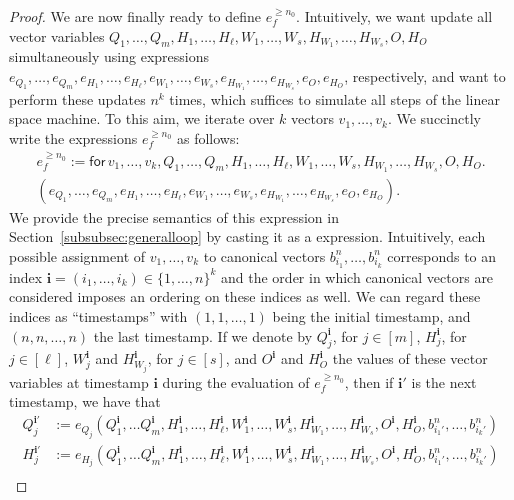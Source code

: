 \begin{proof}
    We are now finally ready to define $e_f^{\geq n_0}$. Intuitively, we want update all vector variables
	$Q_1,\ldots,\allowbreak Q_m,\allowbreak H_1,\ldots,H_\ell,W_1,\ldots,W_s, H_{W_1},\ldots,H_{W_s},O,H_O$
	simultaneously using expressions $e_{Q_1},\ldots,e_{Q_m},\allowbreak e_{H_1},\allowbreak\ldots,\allowbreak e_{H_\ell},\allowbreak e_{W_1},\ldots,e_{W_s},e_{H_{W_1}},\ldots,e_{H_{W_s}},e_{O}, e_{H_O}$, respectively, and want to perform these updates $n^k$ times,
	which suffices to simulate all steps of the linear space machine. To this aim, we iterate over $k$ vectors $v_1,\ldots, v_k$.
	We succinctly write the expressions  $e_f^{\geq n_0}$ as follows:
    \begin{multline*}
    e_f^{\geq n_0}:= \mathsf{for\,} v_1,\ldots,v_{k},Q_1,\ldots,Q_m,H_1,\ldots,H_\ell,W_1,\ldots,W_s, H_{W_1},\ldots,H_{W_s},O,H_O . \\
    (e_{Q_1},\ldots,e_{Q_m},e_{H_1},\ldots,e_{H_\ell},e_{W_1},\ldots,e_{W_s},e_{H_{W_1}},\ldots,e_{H_{W_s}},e_{O}, e_{H_O}).
    \end{multline*}
	We provide the precise semantics of this expression in Section~\ref{subsubsec:generalloop} by casting it as a \langfor expression.
	Intuitively, each possible assignment of $v_1,\ldots,v_k$ to canonical vectors $b_{i_1}^n,\ldots, b_{i_k}^n$ corresponds to an index $\mathbf{i}=(i_1,\ldots,i_k)\in\{1,\ldots,n\}^k$
	and the order in which canonical vectors are considered imposes an ordering on these indices as well. We can regard these indices as ``timestamps''
	with $(1,1,\ldots,1)$ being the initial timestamp, and $(n,n,\ldots,n)$ the last timestamp.
		If we denote by $Q_j^{\mathbf{i}}$, for $j\in[m]$, $H_j^{\mathbf{i}}$, for $j\in[\ell]$, $W_j^{\mathbf{i}}$ and $H_{W_j}^{\mathbf{i}}$, for $j\in[s]$, and 
	$O^{\mathbf{i}}$ and $H_O^{\mathbf{i}}$ the values of these vector variables at timestamp $\mathbf{i}$ during the evaluation of $e_f^{\geq n_0}$, then if $\mathbf{i}'$ is the next timestamp, we have that    
	\begin{align*}
		Q_j^{\mathbf{i}'}&:=e_{Q_j}(Q_1^{\mathbf{i}},\ldots Q_m^{\mathbf{i}},H_1^{\mathbf{i}},\ldots,H_\ell^{\mathbf{i}},W_1^{\mathbf{i}},\ldots,W_s^{\mathbf{i}},H_{W_1}^{\mathbf{i}},\ldots,H_{W_s}^{\mathbf{i}},O^{\mathbf{i}},H_O^{\mathbf{i}},b_{i_1'}^n,\ldots,b_{i_k'}^n)\\
		H_j^{\mathbf{i}'}&:=e_{H_j}(Q_1^{\mathbf{i}},\ldots Q_m^{\mathbf{i}},H_1^{\mathbf{i}},\ldots,H_\ell^{\mathbf{i}},W_1^{\mathbf{i}},\ldots,W_s^{\mathbf{i}},H_{W_1}^{\mathbf{i}},\ldots,H_{W_s}^{\mathbf{i}},O^{\mathbf{i}},H_O^{\mathbf{i}},b_{i_1'}^n,\ldots,b_{i_k'}^n)\\

\end{align*}
\end{proof}
